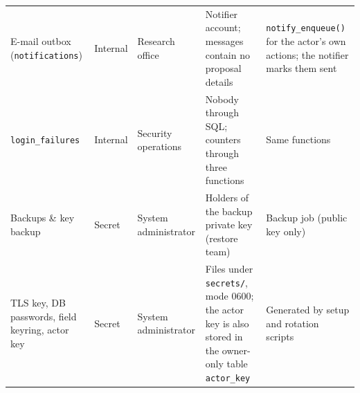\documentclass[10pt,a4paper]{article}
\newcommand{\code}[1]{\nolinkurl{#1}}
\begin{document}
\begin{center}
\begin{longtable}{@{}L{2.63cm}L{1.72cm}L{2.00cm}L{3.99cm}L{4.08cm}@{}}
E-mail outbox (\code{notifications}) & Internal & Research office & Notifier account; messages contain no proposal details & \code{notify\_enqueue()} for the actor's own actions; the notifier marks them sent\\
\code{login_failures} & Internal & Security operations & Nobody through SQL; counters through three functions & Same functions\\
Backups \& key backup & Secret & System administrator & Holders of the backup private key (restore team) & Backup job (public key only)\\
TLS key, DB passwords, field keyring, actor key & Secret & System administrator & Files under \code{secrets/}, mode 0600; the actor key is also stored in the owner-only table \code{actor\_key} & Generated by setup and rotation scripts\\
\bottomrule\end{longtable}\end{center}
\end{document}
